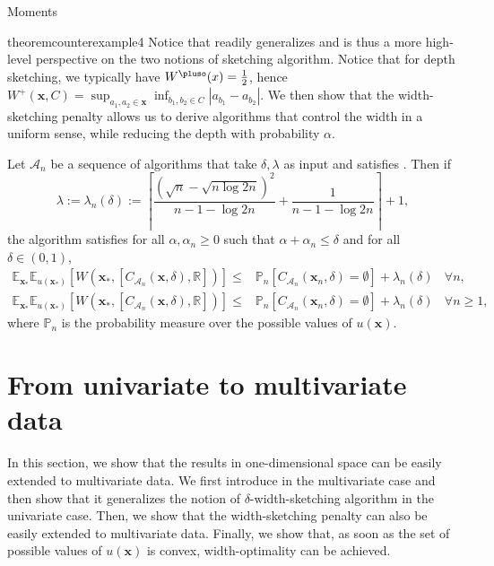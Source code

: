 \begin{assumptioni}[i.i.d data]
\begin{assumptioni}
\begin{assumptioni}{Moments}
\begin{restatable}{theorem}{counterexample4}
Notice that  readily generalizes  and is thus a more high-level perspective on the two notions of sketching algorithm. 
Notice that for depth sketching, we typically have $W^{\pluso}(x) = \frac{1}{2}$, hence $W^+(\bm{x},C) = \sup_{a_1,a_2 \in \bm{x}} \inf_{b_1,b_2 \in C} |a_{b_1} - a_{b_2}|$. 
We then show that the width-sketching penalty allows us to derive algorithms that control the width in a uniform sense, while reducing the depth with probability $\alpha$.
\begin{theorem}\label{thm:width_control}
  Let $\mathcal{A}_n$ be a sequence of algorithms that take $\delta,\lambda$ as input and satisfies . Then if
  \begin{equation}
    \lambda :=\lambda_n(\delta) := \left\lceil \frac{(\sqrt{n} - \sqrt{n \log 2n})^2}{n - 1 - \log 2n} + \frac{1}{n - 1 - \log 2n}\right \rceil + 1,
  \end{equation}
  the algorithm satisfies for all $\alpha,\alpha_n \geq 0$ such that $\alpha + \alpha_n \leq \delta$ and for all $\delta \in (0,1)$,  
  \begin{align}
    \mathbb{E}_{\bm{x}_*}\mathbb{E}_{u(\bm{x_*})}\left[W(\bm{x_*},[C_{\mathcal{A}_n}(\bm{x},\delta),\mathbb{R}])\right] \leq & \mathbb{P}_n[C_{\mathcal{A}_n}(\bm{x}_n,\delta) = \emptyset] + \lambda_n(\delta) ~~~~ \forall n, \\
    \mathbb{E}_{\bm{x}_*}\mathbb{E}_{u(\bm{x_*})}\left[W(\bm{x_*},[C_{\mathcal{A}_n}(\bm{x},\delta),\mathbb{R}])\right] \leq & \mathbb{P}_n[C_{\mathcal{A}_n}(\bm{x}_n,\delta) = \emptyset] + \lambda_n(\delta)  ~~~~ \forall n \geq 1,
  \end{align} 
  where $\mathbb{P}_n$ is the probability measure over the possible values of $u(\bm{x})$.
\end{theorem}




\section{From univariate to multivariate data}

In this section, we show that the results in one-dimensional space can be easily extended to multivariate data. We first introduce  in the multivariate case and then show that it generalizes the notion of $\delta$-width-sketching algorithm in the univariate case. Then, we show that the width-sketching penalty can also be easily extended to multivariate data. Finally, we show that, as soon as the set of possible values of $u(\bm{x})$ is convex, width-optimality can be achieved.

\end{restatable}
\end{assumptioni}
\end{assumptioni}
\end{assumptioni}
